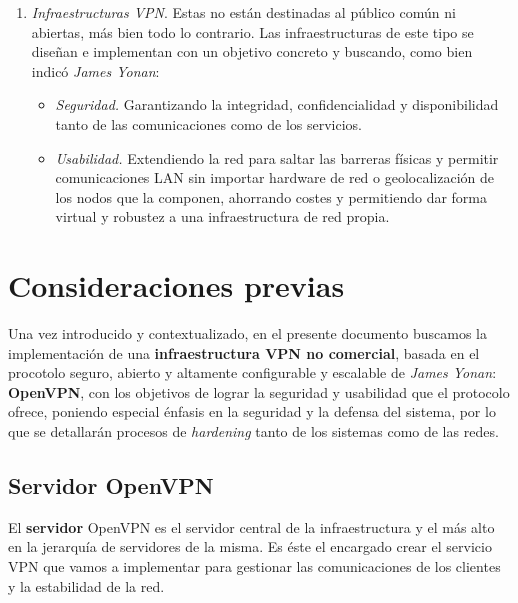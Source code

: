 \documentclass[a4paper, 11pt, titlepage]{article}
\begin{document}
\begin{enumerate}
            \item \textit{Infraestructuras VPN}. Estas no están destinadas al público común ni abiertas, más bien todo lo contrario.
            Las infraestructuras de este tipo se diseñan e implementan con un objetivo concreto y buscando, como bien indicó 
            \textit{James Yonan}:
            
            \begin{itemize}
                \item \textit{Seguridad.} Garantizando la integridad, confidencialidad y disponibilidad tanto de las comunicaciones 
                como de los servicios.
                \item \textit{Usabilidad.} Extendiendo la red para saltar las barreras físicas y permitir comunicaciones LAN sin 
                importar hardware de red o geolocalización de los nodos que la componen, ahorrando costes y permitiendo dar forma
                virtual y robustez a una infraestructura de red propia.
            \end{itemize}

        \end{enumerate}

    \section{Consideraciones previas}

        Una vez introducido y contextualizado, en el presente documento buscamos la implementación de
        una \textbf{infraestructura VPN no comercial}, basada en el procotolo seguro, abierto y altamente
        configurable y escalable de \textit{James Yonan}: \textbf{OpenVPN}, con los objetivos de lograr
        la seguridad y usabilidad que el protocolo ofrece, poniendo especial énfasis en la seguridad y
        la defensa del sistema, por lo que se detallarán procesos de \textit{hardening} tanto de los 
        sistemas como de las redes.

    \subsection{Servidor OpenVPN}

        El \textbf{servidor} OpenVPN es el servidor central de la infraestructura y el más alto en la 
        jerarquía de servidores de la misma. Es éste el encargado crear el servicio VPN que vamos a 
        implementar para gestionar las comunicaciones de los clientes y la estabilidad de la red.
\end{document}

